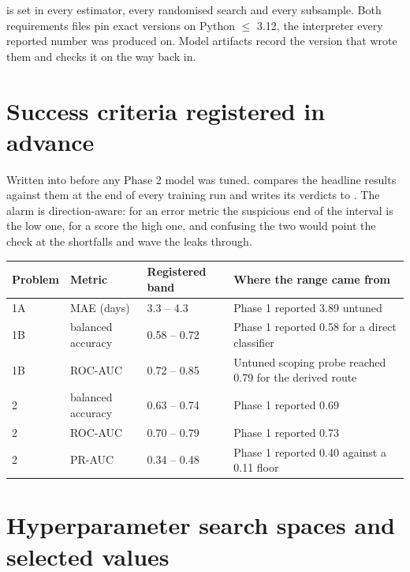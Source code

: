  is set in every estimator, every randomised search and every
subsample. Both requirements files pin exact versions on Python $\le$ 3.12, the
interpreter every reported number was produced on. Model artifacts record the
 version that wrote them and 
checks it on the way back in.

\section{Success criteria registered in advance}
\label{app:bands}

Written into  before any Phase 2 model was tuned.
 compares the headline results against them at the
end of every training run and writes its verdicts to
. The alarm is direction-aware: for an error
metric the suspicious end of the interval is the low one, for a score the high
one, and confusing the two would point the check at the shortfalls and wave the
leaks through.

\begin{center}
\small
\begin{tabular}{@{}lllp{6.3cm}@{}}
\toprule
\textbf{Problem} & \textbf{Metric} & \textbf{Registered band} & \textbf{Where the range came from} \\
\midrule
1A & MAE (days) & 3.3 -- 4.3 & Phase 1 reported 3.89 untuned \\
1B & balanced accuracy & 0.58 -- 0.72 & Phase 1 reported 0.58 for a direct classifier \\
1B & ROC-AUC & 0.72 -- 0.85 & Untuned scoping probe reached 0.79 for the derived route \\
2 & balanced accuracy & 0.63 -- 0.74 & Phase 1 reported 0.69 \\
2 & ROC-AUC & 0.70 -- 0.79 & Phase 1 reported 0.73 \\
2 & PR-AUC & 0.34 -- 0.48 & Phase 1 reported 0.40 against a 0.11 floor \\
\bottomrule
\end{tabular}
\end{center}

\section{Hyperparameter search spaces and selected values}
\label{app:hyperparameters}

